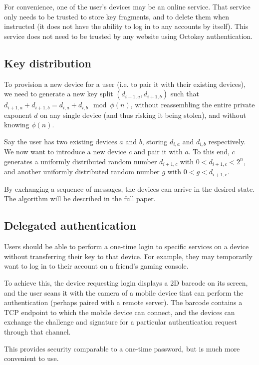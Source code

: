 \documentclass{article}
\begin{document}
For convenience, one of the user's devices may be an online service. That service only needs to be
trusted to store key fragments, and to delete them when instructed (it does not have the ability to
log in to any accounts by itself). This service does not need to be trusted by any website using
Octokey authentication.

\subsection{Key distribution}

To provision a new device for a user (i.e. to pair it with their existing devices), we need to
generate a new key split $(d_{i+1,a}, d_{i+1,b})$ such that
$d_{i+1,a} + d_{i+1,b} = d_{i,a} + d_{i,b} \mod \phi(n)$, without reassembling the entire private
exponent $d$ on any single device (and thus risking it being stolen), and without knowing $\phi(n)$.

Say the user has two existing devices $a$ and $b$, storing $d_{i,a}$ and $d_{i,b}$ respectively. We
now want to introduce a new device $c$ and pair it with $a$. To this end, $c$ generates a uniformly
distributed random number $d_{i+1,c}$ with $0 < d_{i+1,c} < 2^n$, and another uniformly distributed
random number $g$ with $0 < g < d_{i+1,c}$.

By exchanging a sequence of messages, the devices can arrive in the desired state. The algorithm
will be described in the full paper.

\subsection{Delegated authentication}

Users should be able to perform a one-time login to specific services on a device without
transferring their key to that device. For example, they may temporarily want to log in to their
account on a friend's gaming console.

To achieve this, the device requesting login displays a 2D barcode on its screen, and the user scans
it with the camera of a mobile device that can perform the authentication (perhaps paired with a
remote server). The barcode contains a TCP endpoint to which the mobile device can connect, and
the devices can exchange the challenge and signature for a particular authentication request through
that channel.

This provides security comparable to a one-time password, but is much more convenient to use.
\end{document}
